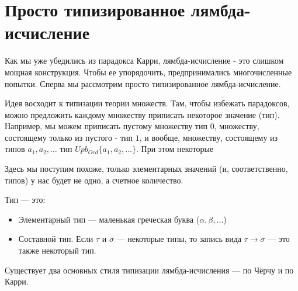\section{Просто типизированное лямбда-исчисление}

Как мы уже убедились из парадокса Карри, лямбда-исчисление - это слишком мощная 
конструкция. Чтобы ее упорядочить, предпринимались многочисленные попытки.
Сперва мы рассмотрим просто типизированное лямбда-исчисление.

Идея восходит к типизации теории множеств. Там, чтобы избежать парадоксов,
можно предложить каждому множеству приписать некоторое значение (тип). Например,
мы можем приписать пустому множеству тип $0$, множеству, состоящему только из 
пустого - тип $1$, и вообще, множеству, состоящему из типов $a_1, a_2, \dots$
тип $Upb_{Ord} \{a_1, a_2, \dots\}$. При этом некоторые 

Здесь мы поступим похоже, только элементарных значений (и, соответственно, 
типов) у нас будет не одно, а счетное количество.

\begin{definition}
Тип --- это:
\begin{itemize}
\item Элементарный тип --- маленькая греческая буква ($\alpha, \beta, \dots$)
\item Составной тип. Если $\tau$ и $\sigma$ --- некоторые типы, то запись 
вида $\tau \rightarrow \sigma$ --- это также некоторый тип.
\end{itemize}
\end{definition}

Существует два основных стиля типизации лямбда-исчисления --- по Чёрчу и 
по Карри.


